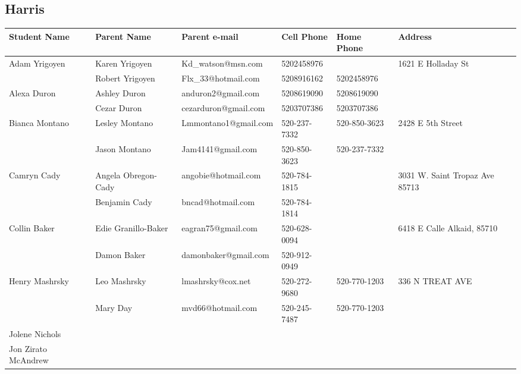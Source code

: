 \documentclass[landscape]{article}\usepackage[]{graphicx}\usepackage[]{color}
\begin{document}
\subsection{Harris}
\begin{longtable}{|p{100pt}|p{100pt}|p{140pt}|p{60pt}|p{64pt}|p{120pt}|}
\textbf{Student Name} & \textbf{Parent Name} & \textbf{Parent e-mail} & \textbf{Cell Phone} & \textbf{Home Phone} & \textbf{Address}\\
\hline
\hline
\multirow{2}{100pt}{Adam Yrigoyen} & Karen Yrigoyen  & Kd\_watson@msn.com & 5202458976 &  & \multirow{2}{120pt}{1621 E Holladay St} \\
 & Robert Yrigoyen & Flx\_33@hotmail.com  & 5208916162 & 5202458976 & \\
\hline
\multirow{2}{100pt}{Alexa Duron} & Ashley Duron & anduron2@gmail.com & 5208619090 & 5208619090 & \multirow{2}{120pt}{} \\
 & Cezar Duron & cezarduron@gmail.com & 5203707386 & 5203707386 & \\
\hline
\multirow{2}{100pt}{Bianca Montano} & Lesley Montano & Lmmontano1@gmail.com & 520-237-7332 & 520-850-3623 & \multirow{2}{120pt}{2428 E 5th Street} \\
 & Jason Montano & Jam4141@gmail.com & 520-850-3623 & 520-237-7332 & \\
\hline
\multirow{2}{100pt}{Camryn Cady} & Angela Obregon-Cady & angobie@hotmail.com & 520-784-1815 &  & \multirow{2}{120pt}{3031 W. Saint Tropaz Ave 85713} \\
 & Benjamin Cady & bncad@hotmail.com & 520-784-1814 &  & \\
\hline
\multirow{2}{100pt}{Collin Baker} & Edie Granillo-Baker & eagran75@gmail.com & 520-628-0094 &  & \multirow{2}{120pt}{6418 E Calle Alkaid, 85710} \\
 & Damon Baker & damonbaker@gmail.com & 520-912-0949 &  & \\
\hline
\multirow{2}{100pt}{Henry Mashrsky} & Leo Mashrsky & lmashrsky@cox.net & 520-272-9680 & 520-770-1203 & \multirow{2}{120pt}{336 N TREAT AVE} \\
 & Mary Day & mvd66@hotmail.com & 520-245-7487 & 520-770-1203 & \\
\hline
\multirow{2}{100pt}{Jolene Nichols} &  &  &  &  & \multirow{2}{120pt}{} \\
 &  &  &  &  & \\
\hline
\multirow{2}{100pt}{Jon Zirato McAndrew} &  &  &  &  & \multirow{2}{120pt}{} \\
 &  &  &  &  & \\

\end{longtable}
\end{document}
